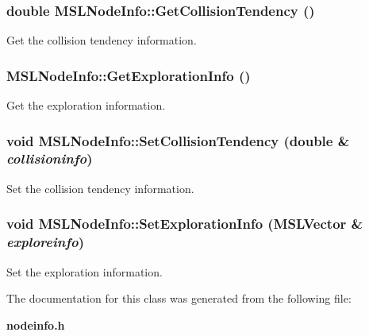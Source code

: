 \subsubsection{\setlength{\rightskip}{0pt plus 5cm}double MSLNode\-Info::Get\-Collision\-Tendency ()\hspace{0.3cm}{\tt  [inline]}}\label{classMSLNodeInfo_a2}


Get the collision tendency information.

\subsubsection{ MSLNode\-Info::Get\-Exploration\-Info ()\hspace{0.3cm}{\tt  [inline]}}\label{classMSLNodeInfo_a0}


Get the exploration information.

\subsubsection{\setlength{\rightskip}{0pt plus 5cm}void MSLNode\-Info::Set\-Collision\-Tendency (double \& {\em collisioninfo})\hspace{0.3cm}{\tt  [inline]}}\label{classMSLNodeInfo_a3}


Set the collision tendency information.

\subsubsection{\setlength{\rightskip}{0pt plus 5cm}void MSLNode\-Info::Set\-Exploration\-Info ({\bf MSLVector} \& {\em exploreinfo})\hspace{0.3cm}{\tt  [inline]}}\label{classMSLNodeInfo_a1}


Set the exploration information.



The documentation for this class was generated from the following file:\begin{CompactItemize}
\item 
{\bf nodeinfo.h}\end{CompactItemize}
